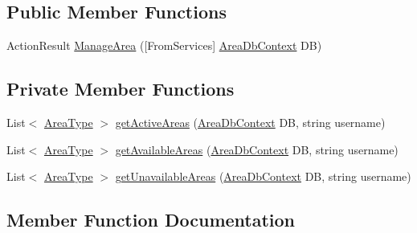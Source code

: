 \subsection*{Public Member Functions}
\begin{DoxyCompactItemize}
\item 
Action\+Result \mbox{\hyperlink{classArea_1_1Controllers_1_1ManageAreaController_a5d3d86fcfe1e256e1ca8f8f316f5a9fc}{Manage\+Area}} (\mbox{[}From\+Services\mbox{]} \mbox{\hyperlink{classArea_1_1DAT_1_1AreaDbContext}{Area\+Db\+Context}} DB)
\end{DoxyCompactItemize}
\subsection*{Private Member Functions}
\begin{DoxyCompactItemize}
\item 
List$<$ \mbox{\hyperlink{classArea_1_1Models_1_1AreaType}{Area\+Type}} $>$ \mbox{\hyperlink{classArea_1_1Controllers_1_1ManageAreaController_af30cf6d59cf0ce70de54adc3f706da0b}{get\+Active\+Areas}} (\mbox{\hyperlink{classArea_1_1DAT_1_1AreaDbContext}{Area\+Db\+Context}} DB, string username)
\item 
List$<$ \mbox{\hyperlink{classArea_1_1Models_1_1AreaType}{Area\+Type}} $>$ \mbox{\hyperlink{classArea_1_1Controllers_1_1ManageAreaController_a04c1155798ffbfc4f87564fe48db8981}{get\+Available\+Areas}} (\mbox{\hyperlink{classArea_1_1DAT_1_1AreaDbContext}{Area\+Db\+Context}} DB, string username)
\item 
List$<$ \mbox{\hyperlink{classArea_1_1Models_1_1AreaType}{Area\+Type}} $>$ \mbox{\hyperlink{classArea_1_1Controllers_1_1ManageAreaController_a17a1989e93097ab54cf340bbfafd7bb3}{get\+Unavailable\+Areas}} (\mbox{\hyperlink{classArea_1_1DAT_1_1AreaDbContext}{Area\+Db\+Context}} DB, string username)
\end{DoxyCompactItemize}


\subsection{Member Function Documentation}
\mbox{\label{classArea_1_1Controllers_1_1ManageAreaController_af30cf6d59cf0ce70de54adc3f706da0b}} 
